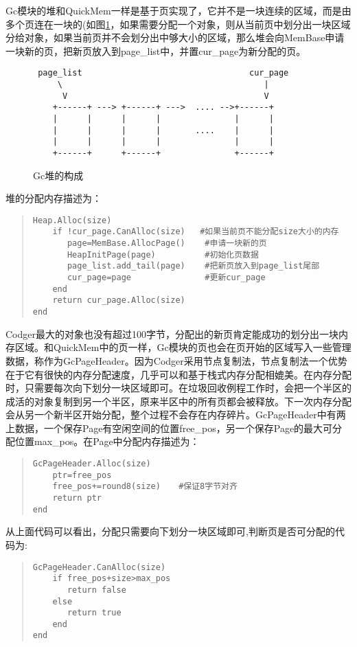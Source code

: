 Gc模块的堆和QuickMem一样是基于页实现了，它并不是一块连续的区域，而是由多个页连在一块的(如图\ref{fig:gc_heap}，如果需要分配一个对象，则从当前页中划分出一块区域分给对象，如果当前页并不会划分出中够大小的区域，那么堆会向MemBase申请一块新的页，把新页放入到page\_list中，并置cur\_page为新分配的页。
\begin{figure}
\begin{verbatim}
 page_list                                  cur_page
     \                                         |
      V                                        V
    +------+ ---> +------+ --->  .... -->+------+      
    |      |      |      |               |      |
    |      |      |      |       ....    |      |
    |      |      |      |               |      |
    +------+      +------+               +------+
\end{verbatim}
\caption{Gc堆的构成}
\label{fig:gc_heap}
\end{figure}
堆的分配内存描述为：
\begin{quote}
\begin{verbatim}
Heap.Alloc(size)
    if !cur_page.CanAlloc(size)   #如果当前页不能分配size大小的内存
       page=MemBase.AllocPage()    #申请一块新的页
       HeapInitPage(page)          #初始化页数据
       page_list.add_tail(page)    #把新页放入到page_list尾部
       cur_page=page               #更新cur_page
    end
    return cur_page.Alloc(size)
end
\end{verbatim}
\end{quote}
Codger最大的对象也没有超过100字节，分配出的新页肯定能成功的划分出一块内存区域。和QuickMem中的页一样，Gc模块的页也会在页开始的区域写入一些管理数据，称作为GcPageHeader。因为Codger采用节点复制法，节点复制法一个优势在于它有很快的内存分配速度，几乎可以和基于栈式内存分配相媲美。在内存分配时，只需要每次向下划分一块区域即可。在垃圾回收例程工作时，会把一个半区的成活的对象复制到另一个半区，原来半区中的所有页都会被释放。下一次内存分配会从另一个新半区开始分配，整个过程不会存在内存碎片。GcPageHeader中有两上数据，一个保存Page有空闲空间的位置free\_pos，另一个保存Page的最大可分配位置max\_pos。在Page中分配内存描述为：
\begin{quote}
\begin{verbatim}
GcPageHeader.Alloc(size)
    ptr=free_pos
    free_pos+=round8(size)　  #保证8字节对齐
    return ptr
end 
\end{verbatim}
\end{quote}
从上面代码可以看出，分配只需要向下划分一块区域即可,判断页是否可分配的代码为:
\begin{quote}
\begin{verbatim}
GcPageHeader.CanAlloc(size)
    if free_pos+size>max_pos
       return false
    else 
       return true
    end
end 
\end{verbatim}
\end{quote}

